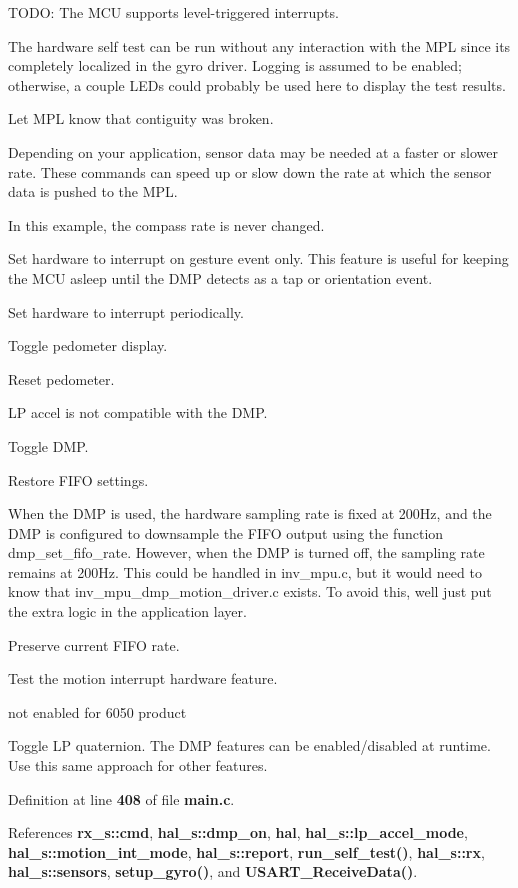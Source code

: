 T\+O\+DO\+: The M\+CU supports level-\/triggered interrupts.

The hardware self test can be run without any interaction with the M\+PL since it\textquotesingle{}s completely localized in the gyro driver. Logging is assumed to be enabled; otherwise, a couple L\+E\+Ds could probably be used here to display the test results.

Let M\+PL know that contiguity was broken.

Depending on your application, sensor data may be needed at a faster or slower rate. These commands can speed up or slow down the rate at which the sensor data is pushed to the M\+PL.

In this example, the compass rate is never changed.

Set hardware to interrupt on gesture event only. This feature is useful for keeping the M\+CU asleep until the D\+MP detects as a tap or orientation event.

Set hardware to interrupt periodically.

Toggle pedometer display.

Reset pedometer.

LP accel is not compatible with the D\+MP.

Toggle D\+MP.

Restore F\+I\+FO settings.

When the D\+MP is used, the hardware sampling rate is fixed at 200\+Hz, and the D\+MP is configured to downsample the F\+I\+FO output using the function dmp\+\_\+set\+\_\+fifo\+\_\+rate. However, when the D\+MP is turned off, the sampling rate remains at 200\+Hz. This could be handled in inv\+\_\+mpu.\+c, but it would need to know that inv\+\_\+mpu\+\_\+dmp\+\_\+motion\+\_\+driver.\+c exists. To avoid this, we\textquotesingle{}ll just put the extra logic in the application layer.

Preserve current F\+I\+FO rate.

Test the motion interrupt hardware feature.

not enabled for 6050 product

Toggle LP quaternion. The D\+MP features can be enabled/disabled at runtime. Use this same approach for other features.

Definition at line \textbf{ 408} of file \textbf{ main.\+c}.



References \textbf{ rx\+\_\+s\+::cmd}, \textbf{ hal\+\_\+s\+::dmp\+\_\+on}, \textbf{ hal}, \textbf{ hal\+\_\+s\+::lp\+\_\+accel\+\_\+mode}, \textbf{ hal\+\_\+s\+::motion\+\_\+int\+\_\+mode}, \textbf{ hal\+\_\+s\+::report}, \textbf{ run\+\_\+self\+\_\+test()}, \textbf{ hal\+\_\+s\+::rx}, \textbf{ hal\+\_\+s\+::sensors}, \textbf{ setup\+\_\+gyro()}, and \textbf{ U\+S\+A\+R\+T\+\_\+\+Receive\+Data()}.



